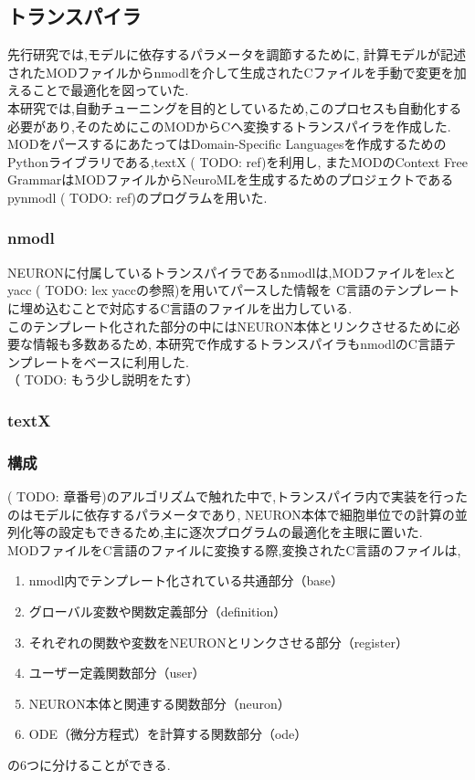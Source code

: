 \subsection{トランスパイラ}
先行研究\cite{miyamoto-master}では,モデルに依存するパラメータを調節するために,
計算モデルが記述されたMODファイルからnmodlを介して生成されたCファイルを手動で変更を加えることで最適化を図っていた.\\
本研究では,自動チューニングを目的としているため,このプロセスも自動化する必要があり,そのためにこのMODからCへ変換するトランスパイラを作成した.\\
MODをパースするにあたってはDomain-Specific Languagesを作成するためのPythonライブラリである,textX ( TODO: ref)を利用し,
またMODのContext Free GrammarはMODファイルからNeuroMLを生成するためのプロジェクトであるpynmodl ( TODO: ref)のプログラムを用いた.\\

\subsubsection{nmodl}
NEURONに付属しているトランスパイラであるnmodlは,MODファイルをlexとyacc ( TODO: lex yaccの参照)を用いてパースした情報を
C言語のテンプレートに埋め込むことで対応するC言語のファイルを出力している.\\
このテンプレート化された部分の中にはNEURON本体とリンクさせるために必要な情報も多数あるため,
本研究で作成するトランスパイラもnmodlのC言語テンプレートをベースに利用した.\\
（ TODO: もう少し説明をたす）

\subsubsection{textX}


\subsubsection{構成}
( TODO: 章番号)のアルゴリズムで触れた中で,トランスパイラ内で実装を行ったのはモデルに依存するパラメータであり,
NEURON本体で細胞単位での計算の並列化等の設定もできるため,主に逐次プログラムの最適化を主眼に置いた.\\

MODファイルをC言語のファイルに変換する際,変換されたC言語のファイルは,\\
\begin{enumerate}
\item nmodl内でテンプレート化されている共通部分（base）
\item グローバル変数や関数定義部分（definition）
\item それぞれの関数や変数をNEURONとリンクさせる部分（register）
\item ユーザー定義関数部分（user）
\item NEURON本体と関連する関数部分（neuron）
\item ODE（微分方程式）を計算する関数部分（ode）
\end{enumerate}
の6つに分けることができる.\\

